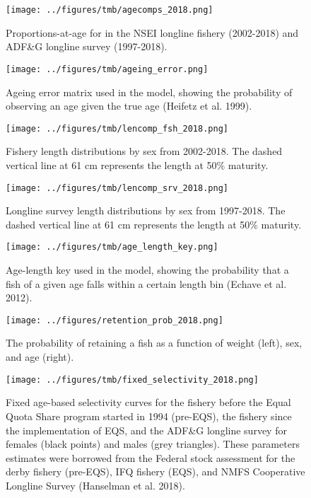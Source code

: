 \documentclass[]{article}
\begin{document}
\begin{figure}
\centering
\texttt{[image: ../figures/tmb/agecomps\_2018.png]}
\caption{\label{fig:agecomps}Proportions-at-age for in the NSEI longline
fishery (2002-2018) and ADF\&G longline survey (1997-2018).}
\end{figure}

\begin{figure}
\centering
\texttt{[image: ../figures/tmb/ageing\_error.png]}
\caption{\label{fig:ageerror}Ageing error matrix used in the model, showing
the probability of observing an age given the true age (Heifetz et al.
1999).}
\end{figure}

\begin{figure}
\centering
\texttt{[image: ../figures/tmb/lencomp\_fsh\_2018.png]}
\caption{\label{fig:fshlen}Fishery length distributions by sex from
2002-2018. The dashed vertical line at 61 cm represents the length at
50\% maturity.}
\end{figure}

\begin{figure}
\centering
\texttt{[image: ../figures/tmb/lencomp\_srv\_2018.png]}
\caption{\label{fig:srvlen}Longline survey length distributions by sex from
1997-2018. The dashed vertical line at 61 cm represents the length at
50\% maturity.}
\end{figure}

\begin{figure}
\centering
\texttt{[image: ../figures/tmb/age\_length\_key.png]}
\caption{\label{fig:agelenkey}Age-length key used in the model, showing the
probability that a fish of a given age falls within a certain length bin
(Echave et al. 2012).}
\end{figure}

\begin{figure}
\centering
\texttt{[image: ../figures/retention\_prob\_2018.png]}
\caption{\label{fig:retention}The probability of retaining a fish as a
function of weight (left), sex, and age (right).}
\end{figure}

\begin{figure}
\centering
\texttt{[image: ../figures/tmb/fixed\_selectivity\_2018.png]}
\caption{\label{fig:fixedsel}Fixed age-based selectivity curves for the
fishery before the Equal Quota Share program started in 1994 (pre-EQS),
the fishery since the implementation of EQS, and the ADF\&G longline
survey for females (black points) and males (grey triangles). These
parameters estimates were borrowed from the Federal stock assessment for
the derby fishery (pre-EQS), IFQ fishery (EQS), and NMFS Cooperative
Longline Survey (Hanselman et al. 2018).}
\end{figure}
\end{document}

